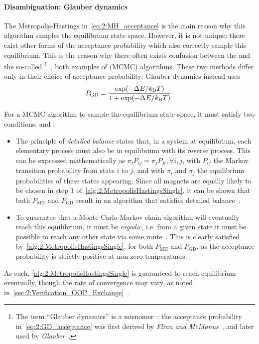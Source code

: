 \paragraph{Disambiguation: Glauber dynamics}
The Metropolis-Hastings  in~\cref{eq:2:MH_acceptance} is the main reason why this algorithm samples the equilibrium state space.
However, it is not unique: there exist other forms of the acceptance probability which also correctly sample this equilibrium.
This is the reason why there often exists confusion between the  and the so-called \footnote{
	The term ``Glauber dynamics'' is a misnomer~\cite{bit-player_MCvsGlauber}; the acceptance probability in~\cref{eq:2:GD_acceptance} was first derived by \textit{Flinn and McManus}~\cite{flinn1961TransitionProbability}, and later used by \textit{Glauber}~\cite{glauber1963time}.
}~\cite{flinn1961TransitionProbability,glauber1963time}, both examples of  (MCMC) algorithms.
These two methods differ only in their choice of acceptance probability: Glauber dynamics instead uses
\begin{equation}
	\label{eq:2:GD_acceptance}
	P_\mathrm{GD} = \frac{\exp(-\Delta E / \kBT)}{1 + \exp(-\Delta E / \kBT)} \mathrm{.}
\end{equation}

For a MCMC algorithm to sample the equilibrium state space, it must satisfy two conditions:  and .
\begin{itemize}
	\item The principle of \textit{detailed balance} states that, in a system at equilibrium, each elementary process must also be in equilibrium with its reverse process.
	This can be expressed mathematically as $\pi_i P_{ij} = \pi_j P_{ji}, \forall i,j$, with $P_{ij}$ the Markov transition probability from state $i$ to $j$, and with $\pi_i$ and $\pi_j$ the equilibrium probabilities of these states appearing.
	Since all magnets are equally likely to be chosen in step 1 of~\cref{alg:2:MetropolisHastingsSingle}, it can be shown that both $P_\mathrm{MH}$ and $P_\mathrm{GD}$ result in an algorithm that satisfies detailed balance~\cite{kyimba2006comparisonIsingAlgorithms}.
	\item To guarantee that a Monte Carlo Markov chain algorithm will eventually reach this equilibrium, it must be \textit{ergodic}, i.e. from a given state it must be possible to reach any other state via some route~\cite{kyimba2006comparisonIsingAlgorithms}.
	This is clearly satisfied by~\cref{alg:2:MetropolisHastingsSingle}, for both $P_\mathrm{MH}$ and $P_\mathrm{GD}$, as the acceptance probability is strictly positive at non-zero temperatures.
\end{itemize}
As such, \cref{alg:2:MetropolisHastingsSingle} is guaranteed to reach equilibrium eventually, though the rate of convergence may vary, as noted in~\cref{sec:2:Verification_OOP_Exchange}~\cite{jang2004stochastic}. %

